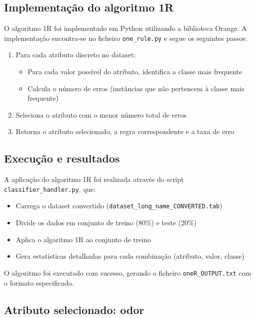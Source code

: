\documentclass[12pt,a4paper]{article}
\begin{document}
\subsection{Implementação do algoritmo 1R}

O algoritmo 1R foi implementado em Python utilizando a biblioteca Orange. A implementação encontra-se no ficheiro \texttt{one\_rule.py} e segue os seguintes passos:

\begin{enumerate}
    \item Para cada atributo discreto no dataset:
    \begin{itemize}
        \item Para cada valor possível do atributo, identifica a classe mais frequente
        \item Calcula o número de erros (instâncias que não pertencem à classe mais frequente)
    \end{itemize}
    \item Seleciona o atributo com o menor número total de erros
    \item Retorna o atributo selecionado, a regra correspondente e a taxa de erro
\end{enumerate}

\subsection{Execução e resultados}

A aplicação do algoritmo 1R foi realizada através do script \texttt{classifier\_handler.py}, que:
\begin{itemize}
    \item Carrega o dataset convertido (\texttt{dataset\_long\_name\_CONVERTED.tab})
    \item Divide os dados em conjunto de treino (80\%) e teste (20\%)
    \item Aplica o algoritmo 1R ao conjunto de treino
    \item Gera estatísticas detalhadas para cada combinação (atributo, valor, classe)
\end{itemize}

O algoritmo foi executado com sucesso, gerando o ficheiro \texttt{oneR\_OUTPUT.txt} com o formato especificado.

\subsection{Atributo selecionado: odor}
\end{document}
